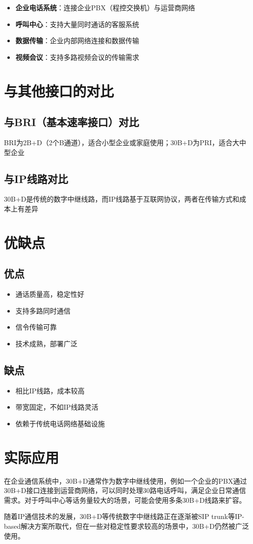 \documentclass[12pt,UTF8]{ctexbook}
\begin{document}
\begin{itemize}
  \item \textbf{企业电话系统}：连接企业PBX（程控交换机）与运营商网络
  \item \textbf{呼叫中心}：支持大量同时通话的客服系统
  \item \textbf{数据传输}：企业内部网络连接和数据传输
  \item \textbf{视频会议}：支持多路视频会议的传输需求
\end{itemize}

\chapter{与其他接口的对比}

\section{与BRI（基本速率接口）对比}

BRI为2B+D（2个B通道），适合小型企业或家庭使用；30B+D为PRI，适合大中型企业

\section{与IP线路对比}

30B+D是传统的数字中继线路，而IP线路基于互联网协议，两者在传输方式和成本上有差异

\chapter{优缺点}

\section{优点}

\begin{itemize}
  \item 通话质量高，稳定性好
  \item 支持多路同时通信
  \item 信令传输可靠
  \item 技术成熟，部署广泛
\end{itemize}

\section{缺点}

\begin{itemize}
  \item 相比IP线路，成本较高
  \item 带宽固定，不如IP线路灵活
  \item 依赖于传统电话网络基础设施
\end{itemize}

\chapter{实际应用}

在企业通信系统中，30B+D通常作为数字中继线使用，例如一个企业的PBX通过30B+D接口连接到运营商网络，可以同时处理30路电话呼叫，满足企业日常通信需求。对于呼叫中心等话务量较大的场景，可能会使用多条30B+D线路来扩容。

随着IP通信技术的发展，30B+D等传统数字中继线路正在逐渐被SIP trunk等IP-based解决方案所取代，但在一些对稳定性要求较高的场景中，30B+D仍然被广泛使用。

\backmatter
\end{document}
